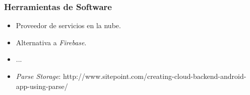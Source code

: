 \begin{frame}
	\frametitle{Herramientas de Software}
		\begin{itemize}
			\item Proveedor de servicios en la nube.
			\item Alternativa a {\it Firebase}.
			\item ...
		\end{itemize}
	\endblock{}
		\begin{itemize}
			\item {\it Parse Storage}: {\texttt\small{http://www.sitepoint.com/creating-cloud-backend-android-app-using-parse/}}
		\end{itemize}
	\endblock{}
\end{frame}